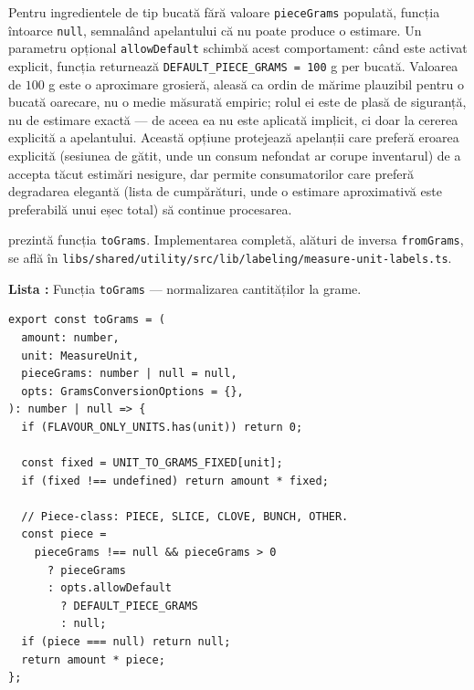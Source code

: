 Pentru ingredientele de tip bucată fără valoare \texttt{pieceGrams} populată, funcția întoarce \texttt{null}, semnalând apelantului că nu poate produce o estimare. Un parametru opțional \texttt{allowDefault} schimbă acest comportament: când este activat explicit, funcția returnează \texttt{DEFAULT\_PIECE\_GRAMS = 100} g per bucată. Valoarea de \(100\) g este o aproximare grosieră, aleasă ca ordin de mărime plauzibil pentru o bucată oarecare, nu o medie măsurată empiric; rolul ei este de plasă de siguranță, nu de estimare exactă --- de aceea ea nu este aplicată implicit, ci doar la cererea explicită a apelantului. Această opțiune protejează apelanții care preferă eroarea explicită (sesiunea de gătit, unde un consum nefondat ar corupe inventarul) de a accepta tăcut estimări nesigure, dar permite consumatorilor care preferă degradarea elegantă (lista de cumpărături, unde o estimare aproximativă este preferabilă unui eșec total) să continue procesarea.

 prezintă funcția \texttt{toGrams}. Implementarea completă, alături de inversa \texttt{fromGrams}, se află în \texttt{libs/\allowbreak shared/\allowbreak utility/\allowbreak src/\allowbreak lib/\allowbreak labeling/\allowbreak measure-unit-labels.ts}.

\label{lst:to-grams}
\par\medskip
\noindent\begin{minipage}{\linewidth}
\textbf{Lista \thecodlista:} Funcția \texttt{toGrams} --- normalizarea cantităților la grame.
\begin{Verbatim}[fontsize=\small]
export const toGrams = (
  amount: number,
  unit: MeasureUnit,
  pieceGrams: number | null = null,
  opts: GramsConversionOptions = {},
): number | null => {
  if (FLAVOUR_ONLY_UNITS.has(unit)) return 0;

  const fixed = UNIT_TO_GRAMS_FIXED[unit];
  if (fixed !== undefined) return amount * fixed;

  // Piece-class: PIECE, SLICE, CLOVE, BUNCH, OTHER.
  const piece =
    pieceGrams !== null && pieceGrams > 0
      ? pieceGrams
      : opts.allowDefault
        ? DEFAULT_PIECE_GRAMS
        : null;
  if (piece === null) return null;
  return amount * piece;
};
\end{Verbatim}
\end{minipage}
\par\medskip

